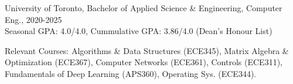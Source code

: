University of Toronto, Bachelor of Applied Science \& Engineering, Computer Eng., 2020-2025 \\
Seasonal GPA: 4.0/4.0, Cummulative GPA: 3.86/4.0 (Dean’s Honour List) \\
\raggedright{Relevant Courses: Algorithms \& Data Structures (ECE345), Matrix Algebra \& Optimization (ECE367), 
Computer Networks (ECE361), Controls (ECE311), Fundamentals of Deep Learning (APS360), Operating Sys. (ECE344).} \\[10pt]
